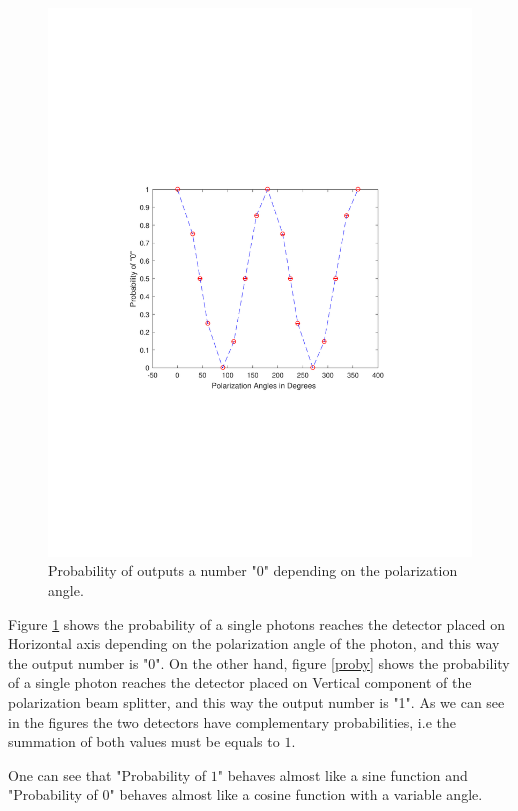 \begin{figure}[H]
    \centering
        \includegraphics[clip, trim=4cm 9cm 4cm 6cm, width=1.00\textwidth]{./sdf/qrng/figures_raw/prob0.pdf}
    \caption{Probability of outputs a number "0" \space depending on the polarization angle.}\label{probx}
\end{figure}

Figure \ref{probx} shows the probability of a single photons reaches the detector placed on Horizontal axis depending on the polarization angle of the photon, and this way the output number is "0". On the other hand, figure \ref{proby} shows the probability of a single photon reaches the detector placed on Vertical component of the polarization beam splitter, and this way the output number is "1". As we can see in the figures the two detectors have complementary probabilities, i.e the summation of both values must be equals to $1$.

One can see that "Probability of $1$" \space behaves almost like a sine function and "Probability of 0" \space behaves almost like a cosine function with a variable angle.


